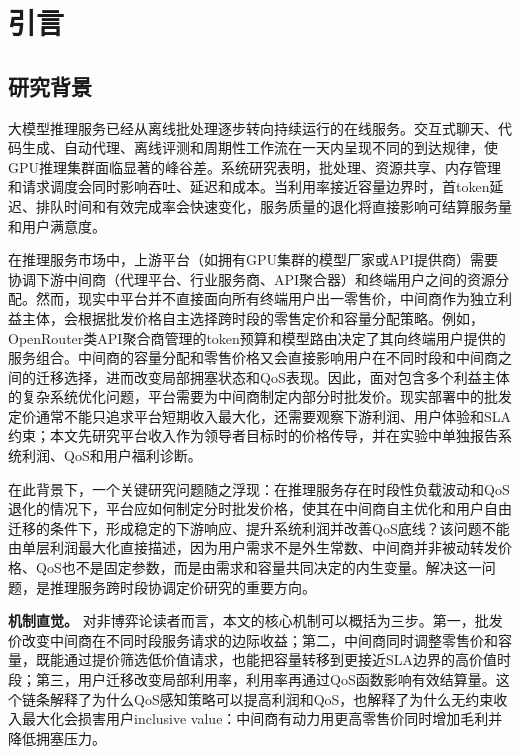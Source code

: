 \documentclass[UTF8,11pt]{ctexart}
\begin{document}
\section{引言}

\subsection{研究背景}

大模型推理服务已经从离线批处理逐步转向持续运行的在线服务。交互式聊天、代码生成、自动代理、离线评测和周期性工作流在一天内呈现不同的到达规律，使GPU推理集群面临显著的峰谷差。系统研究表明，批处理、资源共享、内存管理和请求调度会同时影响吞吐、延迟和成本\cite{crankshaw2017clipper,gujarati2020clockwork,romero2021infaas,yu2022orca,kwon2023pagedattention,agrawal2024sarathiserve}。当利用率接近容量边界时，首token延迟、排队时间和有效完成率会快速变化，服务质量的退化将直接影响可结算服务量和用户满意度。

在推理服务市场中，上游平台（如拥有GPU集群的模型厂家或API提供商）需要协调下游中间商（代理平台、行业服务商、API聚合器）和终端用户之间的资源分配。然而，现实中平台并不直接面向所有终端用户出一零售价，中间商作为独立利益主体，会根据批发价格自主选择跨时段的零售定价和容量分配策略。例如，OpenRouter类API聚合商管理的token预算和模型路由决定了其向终端用户提供的服务组合。中间商的容量分配和零售价格又会直接影响用户在不同时段和中间商之间的迁移选择，进而改变局部拥塞状态和QoS表现。因此，面对包含多个利益主体的复杂系统优化问题，平台需要为中间商制定内部分时批发价。现实部署中的批发定价通常不能只追求平台短期收入最大化，还需要观察下游利润、用户体验和SLA约束；本文先研究平台收入作为领导者目标时的价格传导，并在实验中单独报告系统利润、QoS和用户福利诊断。

在此背景下，一个关键研究问题随之浮现：在推理服务存在时段性负载波动和QoS退化的情况下，平台应如何制定分时批发价格，使其在中间商自主优化和用户自由迁移的条件下，形成稳定的下游响应、提升系统利润并改善QoS底线？该问题不能由单层利润最大化直接描述，因为用户需求不是外生常数、中间商并非被动转发价格、QoS也不是固定参数，而是由需求和容量共同决定的内生变量。解决这一问题，是推理服务跨时段协调定价研究的重要方向。

\textbf{机制直觉。} 对非博弈论读者而言，本文的核心机制可以概括为三步。第一，批发价改变中间商在不同时段服务请求的边际收益；第二，中间商同时调整零售价和容量，既能通过提价筛选低价值请求，也能把容量转移到更接近SLA边界的高价值时段；第三，用户迁移改变局部利用率，利用率再通过QoS函数影响有效结算量。这个链条解释了为什么QoS感知策略可以提高利润和QoS，也解释了为什么无约束收入最大化会损害用户inclusive value：中间商有动力用更高零售价同时增加毛利并降低拥塞压力。
\end{document}
